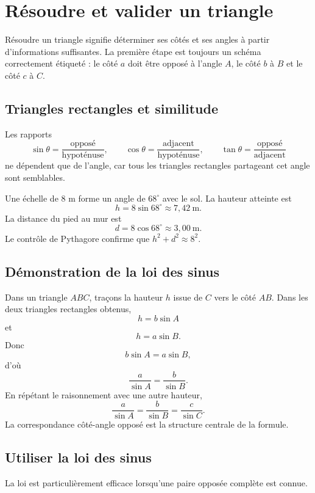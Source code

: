 \documentclass[12pt,a4paper,openany]{book}
\begin{document}
\section{Résoudre et valider un triangle}

Résoudre un triangle signifie déterminer ses côtés et ses angles à partir d'informations suffisantes. La première étape est toujours un schéma correctement étiqueté : le côté $a$ doit être opposé à l'angle $A$, le côté $b$ à $B$ et le côté $c$ à $C$.

\subsection{Triangles rectangles et similitude}

Les rapports
\[
\sin\theta=\frac{\text{opposé}}{\text{hypoténuse}},
\qquad
\cos\theta=\frac{\text{adjacent}}{\text{hypoténuse}},
\qquad
\tan\theta=\frac{\text{opposé}}{\text{adjacent}}
\]
ne dépendent que de l'angle, car tous les triangles rectangles partageant cet angle sont semblables.

\begin{examplebox}
Une échelle de $8$ m forme un angle de $68^\circ$ avec le sol. La hauteur atteinte est
\[
h=8\sin68^\circ\approx7{,}42\ \mathrm{m}.
\]
La distance du pied au mur est
\[
d=8\cos68^\circ\approx3{,}00\ \mathrm{m}.
\]
Le contrôle de Pythagore confirme que $h^2+d^2\approx8^2$.
\end{examplebox}

\subsection{Démonstration de la loi des sinus}

Dans un triangle $ABC$, traçons la hauteur $h$ issue de $C$ vers le côté $AB$. Dans les deux triangles rectangles obtenus,
\[
h=b\sin A
\]
et
\[
h=a\sin B.
\]
Donc
\[
b\sin A=a\sin B,
\]
d'où
\[
\frac a{\sin A}=\frac b{\sin B}.
\]
En répétant le raisonnement avec une autre hauteur,
\[
\frac a{\sin A}=\frac b{\sin B}=\frac c{\sin C}.
\]
La correspondance côté-angle opposé est la structure centrale de la formule.

\subsection{Utiliser la loi des sinus}

La loi est particulièrement efficace lorsqu'une paire opposée complète est connue.
\end{document}
